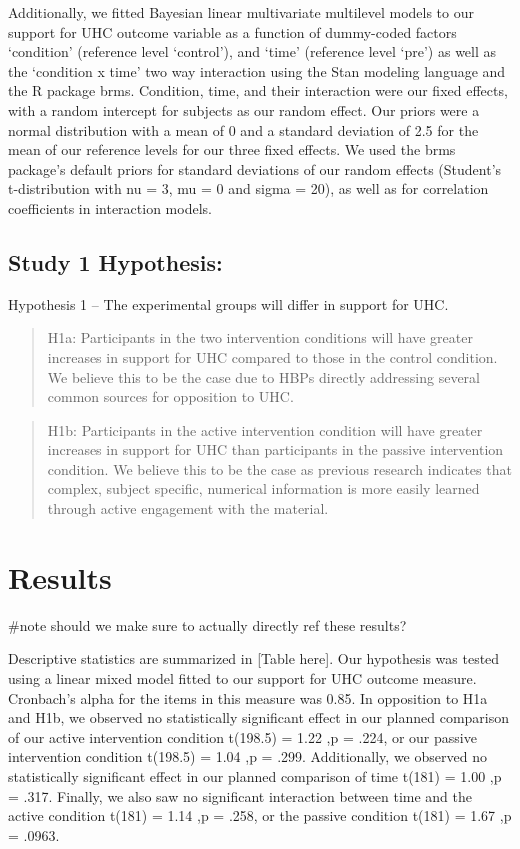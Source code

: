 \documentclass[
  english,
  man]{apa6}
\begin{document}
Additionally, we fitted Bayesian linear multivariate multilevel models to our support for UHC outcome variable as a function of dummy-coded factors `condition' (reference level `control'), and `time' (reference level `pre') as well as the `condition x time' two way interaction using the Stan modeling language and the R package brms. Condition, time, and their interaction were our fixed effects, with a random intercept for subjects as our random effect. Our priors were a normal distribution with a mean of 0 and a standard deviation of 2.5 for the mean of our reference levels for our three fixed effects. We used the brms package's default priors for standard deviations of our random effects (Student's t-distribution with nu = 3, mu = 0 and sigma = 20), as well as for correlation coefficients in interaction models.

\hypertarget{study-1-hypothesis}{%
\subsection{Study 1 Hypothesis:}\label{study-1-hypothesis}}

Hypothesis 1 -- The experimental groups will differ in support for UHC.

\begin{quote}
H1a: Participants in the two intervention conditions will have greater increases in support for UHC compared to those in the control condition. We believe this to be the case due to HBPs directly addressing several common sources for opposition to UHC.
\end{quote}

\begin{quote}
H1b: Participants in the active intervention condition will have greater increases in support for UHC than participants in the passive intervention condition. We believe this to be the case as previous research indicates that complex, subject specific, numerical information is more easily learned through active engagement with the material.
\end{quote}

\hypertarget{results}{%
\section{Results}\label{results}}

\#note should we make sure to actually directly ref these results?

Descriptive statistics are summarized in {[}Table here{]}. Our hypothesis was tested using a linear mixed model fitted to our support for UHC outcome measure. Cronbach's alpha for the items in this measure was 0.85. In opposition to H1a and H1b, we observed no statistically significant effect in our planned comparison of our active intervention condition t(198.5) = 1.22 ,p = .224, or our passive intervention condition t(198.5) = 1.04 ,p = .299. Additionally, we observed no statistically significant effect in our planned comparison of time t(181) = 1.00 ,p = .317. Finally, we also saw no significant interaction between time and the active condition t(181) = 1.14 ,p = .258, or the passive condition t(181) = 1.67 ,p = .0963.
\end{document}
